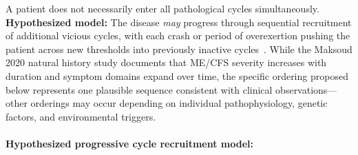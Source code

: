 A patient does not necessarily enter all pathological cycles simultaneously. \textbf{Hypothesized model:} The disease \textit{may} progress through sequential recruitment of additional vicious cycles, with each crash or period of overexertion pushing the patient across new thresholds into previously inactive cycles~\cite{Maksoud2020natural}. While the Maksoud 2020 natural history study documents that ME/CFS severity increases with duration and symptom domains expand over time, the specific ordering proposed below represents one plausible sequence consistent with clinical observations---other orderings may occur depending on individual pathophysiology, genetic factors, and environmental triggers.

\paragraph{Hypothesized progressive cycle recruitment model:}

